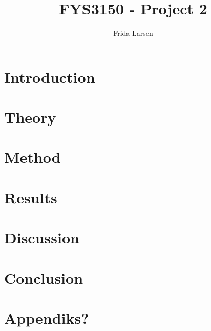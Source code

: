\documentclass[notitlepage, reprint, nofootinbib]{revtex4-1}
\begin{document}
\title{FYS3150 - Project 2}
\author{Frida Larsen}

\begin{abstract}
{\color{red}{Abstract to come}}
\end{abstract}

\maketitle

\section{Introduction} 

\section{Theory}

\section{Method}

\section{Results}

\section{Discussion}

\section{Conclusion}

\section{Appendiks?}

\onecolumngrid


\end{document}

